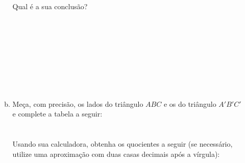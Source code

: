 \documentclass[a4paper,14pt]{article}
\begin{document}
\begin{multicols}{2}
\begin{enumerate}
\begin{enumerate}[a)]
				\renewcommand{\arraystretch}{2} %
				\\\\ Qual é a sua conclusão?  \\\\\\\\\\\\\\\\\\
				\item Meça, com precisão, os lados do triângulo $ABC$ e os do triângulo $A'B'C'$ e complete a tabela a seguir: \\
				\renewcommand{\arraystretch}{2} %
				\\\\ Usando sua calculadora, obtenha os quocientes a seguir (se necessário, utilize uma aproximação com duas casas decimais após a vírgula):\\
				
				\renewcommand{\arraystretch}{3} %
				
				\renewcommand{\arraystretch}{3} %
				

\end{enumerate}
\end{enumerate}
\end{multicols}
\end{document}

